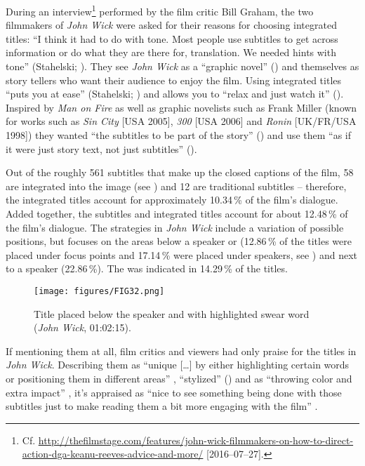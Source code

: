 \largerpage
During an interview\footnote{Cf.\,\,\url{http://thefilmstage.com/features/john-wick-filmmakers-on-how-to-direct-action-dga-keanu-reeves-advice-and-more/} [2016--07--27].} performed by the film critic Bill Graham, the two filmmakers of \textit{John Wick} were asked for their reasons for choosing integrated titles: “I think it had to do with tone. Most people use subtitles to get across information or do what they are there for, translation. We needed hints with tone” (Stahelski; \citealt{Graham2014}). They see \textit{John Wick} as a “graphic novel” (\citeyear{Graham2014}) and themselves as story tellers who want their audience to enjoy the film. Using integrated titles “puts you at ease” (Stahelski; \citealt{Graham2014}) and allows you to “relax and just watch it” (\citeyear{Graham2014}). Inspired by \textit{Man on Fire} as well as graphic novelists such as Frank Miller (known for works such as \textit{Sin City} [USA 2005], \textit{300} [USA 2006] and \textit{Ronin} [UK/FR/USA 1998]) they wanted “the subtitles to be part of the story” (\citeyear{Graham2014}) and use them “as if it were just story text, not just subtitles” (\citeyear{Graham2014}).

Out of the roughly 561 subtitles that make up the closed captions of the film, 58 are integrated into the image (see ) and 12 are traditional subtitles – therefore, the integrated titles account for approximately 10.34\,\% of the film’s dialogue. Added together, the subtitles and integrated titles account for about 12.48\,\% of the film’s dialogue. The  strategies in \textit{John Wick} include a variation of possible positions, but focuses on the areas below a speaker or  (12.86\,\% of the titles were placed under focus points and 17.14\,\% were placed under speakers, see ) and next to a speaker (22.86\,\%). The  was indicated in 14.29\,\% of the titles.

\begin{figure}
\texttt{[image: figures/FIG32.png]}
\caption{Title placed below the speaker and with highlighted swear word (\textit{John Wick}, 01:02:15).}
\label{fig:FIG32}
\end{figure}

If mentioning them at all, film critics and viewers had only praise for the titles in \textit{John Wick}. Describing them as “unique […] by either highlighting certain words or positioning them in different areas” \citep{Abreu2014}, “stylized” (\citeyear{Abreu2014}) and as “throwing color and extra  impact” \citep{robinson2014}, it’s appraised as “nice to see something being done with those subtitles just to make reading them a bit more engaging with the film” \citep{mistry2015}.

